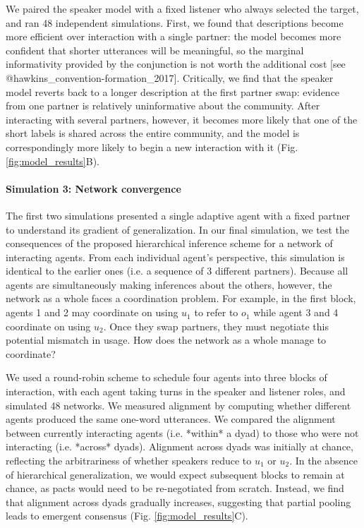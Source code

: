 \documentclass[11pt, floatsintext]{apa6}
\begin{document}
We paired the speaker model with a fixed listener who always selected the target, and ran 48 independent simulations.
First, we found that descriptions become more efficient over interaction with a single partner: the model becomes more confident that shorter utterances will be meaningful, so the marginal informativity provided by the conjunction is not worth the additional cost [see @hawkins_convention-formation_2017].
Critically, we find that the speaker model reverts back to a longer description at the first partner swap: evidence from one partner is relatively uninformative about the community.
After interacting with several partners, however, it becomes more likely that one of the short labels is shared across the entire community, and the model is correspondingly more likely to begin a new interaction with it (Fig. \ref{fig:model_results}B).

\paragraph{Simulation 3: Network convergence}

The first two simulations presented a single adaptive agent with a fixed partner to understand its gradient of generalization. 
In our final simulation, we test the consequences of the proposed hierarchical inference scheme for a network of interacting agents.
From each individual agent's perspective, this simulation is identical to the earlier ones (i.e. a sequence of 3 different partners).
Because all agents are simultaneously making inferences about the others, however, the network as a whole faces a coordination problem.
For example, in the first block, agents 1 and 2 may coordinate on using $u_1$ to refer to $o_1$ while agent 3 and 4 coordinate on using $u_2$. 
Once they swap partners, they must negotiate this potential mismatch in usage. 
How does the network as a whole manage to coordinate?

We used a round-robin scheme to schedule four agents into three blocks of interaction, with each agent taking turns in the speaker and listener roles, and simulated 48 networks.
We measured alignment by computing whether different agents produced the same one-word utterances. 
We compared the alignment between currently interacting agents (i.e. *within* a dyad) to those who were not interacting (i.e. *across* dyads).
Alignment across dyads was initially at chance, reflecting the arbitrariness of whether speakers reduce to $u_1$ or $u_2$. 
In the absence of hierarchical generalization, we would expect subsequent blocks to remain at chance, as pacts would need to be re-negotiated from scratch.
Instead, we find that alignment across dyads gradually increases, suggesting that partial pooling leads to emergent consensus (Fig. \ref{fig:model_results}C).
\end{document}
